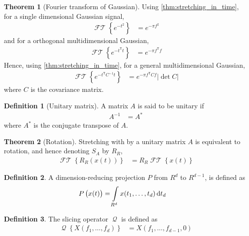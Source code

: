 \documentclass[titlepage, fleqn, a4paper, 12pt, twoside]{article}
\theoremstyle{definition}
\newtheorem{definition}{Definition}
\theoremstyle{theorem}
\newtheorem{theorem}{Theorem}
\DeclareMathOperator{\FT}{\mathcal{FT}}
\DeclareMathOperator{\Q}{\mathcal{Q}}
\def\transpose#1{{#1}^{\mathsf{T}}}
\begin{document}
\begin{theorem}[Fourier transform of Gaussian]
	Using \cref{thm:stretching_in_time}, for a single dimensional Gaussian signal,
	\begin{align*}
		\FT\left\{ e^{-t^2} \right\} &= e^{-\pi f^2}
	\end{align*}
	and for a orthogonal multidimensional Gaussian,
	\begin{align*}
		\FT\left\{ e^{-\transpose{t} t} \right\} &= e^{-\pi \transpose{f} f}
	\end{align*}
	Hence, using \cref{thm:stretching_in_time}, for a general multidimensional Gaussian,
	\begin{align*}
		\FT\left\{ e^{-\transpose{t} C^{-1} t} \right\} &= e^{-\pi \transpose{f} C f} |\det C|
	\end{align*}
	where $C$ is the covariance matrix.
	\label{thm:Fourier_transform_of_Gaussian}
\end{theorem}

\begin{definition}[Unitary matrix]
	A matrix $A$ is said to be unitary if
	\begin{align*}
		A^{-1} &= A^*
	\end{align*}
	where $A^*$ is the conjugate transpose of $A$.
\end{definition}

\begin{theorem}[Rotation]
	Stretching with by a unitary matrix $A$ is equivalent to rotation, and hence denoting $S_A$ by $R_R$,
	\begin{align*}
		\FT\left\{ R_R\left( x(t) \right) \right\} &= R_R \FT\left\{ x(t) \right\}
	\end{align*}
	\label{thm:rotation}
\end{theorem}

\begin{definition}
	A dimension-reducing projection $P$ from $R^d$ to $R^{d - 1}$, is defined as
	\begin{align*}
		P\left( x(t) \right) &= \int\limits_{R^d} x(t_1,\dots,t_d) \dif t_d
	\end{align*}
\end{definition}

\begin{definition}
	The slicing operator $\Q$ is defined as
	\begin{align*}
		\Q\left\{ X(f_1,\dots,f_d) \right\} &= X\left( f_1,\dots,f_{d - 1},0 \right)
	\end{align*}
	\label{def:slicing_operator}
\end{definition}
\end{document}
